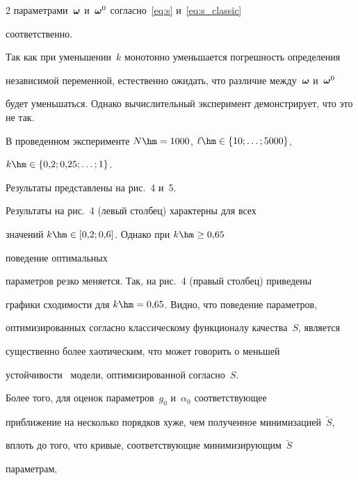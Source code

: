 \begin{multicols}{2}
па\-ра\-мет\-ра\-ми~$\boldsymbol{\omega}$ и~$\boldsymbol{\omega}^0$ согласно~\eqref{eq:s} и~\eqref{eq:s_classic}

соответст\-венно.

{



}



Так как при уменьшении~$k$ монотонно уменьшается погрешность определения 

независимой перемен\-ной, естественно ожидать, что различие между~$\boldsymbol{\omega}$ и~$\boldsymbol{\omega}^0$ 

будет уменьшаться. Однако вы\-чис\-ли\-тельный эксперимент демонстрирует, что это не так.



В проведенном эксперименте $N \hm= 1000$, $\ell \hm\in \{ 10; \dots; 5000 \}$,

$k \hm\in \{ 0{,}2; 0{,}25; \dots; 1 \}$.



Результаты представлены на рис.~4 и~5.













Результаты на рис.~4 (левый столбец) характерны для всех

значений $k \hm\in [0{,}2; 0{,}6]$. Однако при $k\hm \geq 0{,}65$ 

поведение оптимальных

параметров резко меняется. Так, на рис.~4 (правый столбец) приведены

графики сходимости для $k\hm = 0{,}65$. Видно, что поведение параметров,

оптимизированных согласно классическому функционалу качества~$S$, является

существенно более хаотическим, что может говорить о меньшей 

устойчивости~\cite{Rudoy16StabilityAnalysis} модели, оптимизированной согласно~$S$.



Более того, для оценок параметров~$g_0$ и~$\alpha_0$ соответствующее

приближение на несколько порядков хуже, чем полученное минимизацией~$\breve{S}$,

вплоть до того, что кривые, соответствующие минимизирующим~$\breve{S}$ 

параметрам,


\end{multicols}
